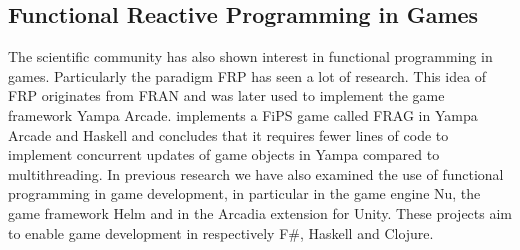 \subsection{Functional Reactive Programming in Games}
The scientific community has also shown interest in functional programming in games. Particularly the paradigm \gls{FRP} has seen a lot of research. This idea of \gls{FRP} originates from FRAN\cite{ElliottHudak97:Fran} and was later used to implement the game framework Yampa Arcade\cite{courtney2003yampa}. \cite{cheong2005functional} implements a \gls{FiPS} game called FRAG in Yampa Arcade and Haskell and concludes that it requires fewer lines of code to implement concurrent updates of game objects in Yampa compared to multithreading. In previous research we have also examined the use of functional programming in game development\cite{p92018gameplay}, in particular in the game engine Nu, the game framework Helm and in the Arcadia extension for Unity. These projects aim to enable game development in respectively F\#, Haskell and Clojure.
